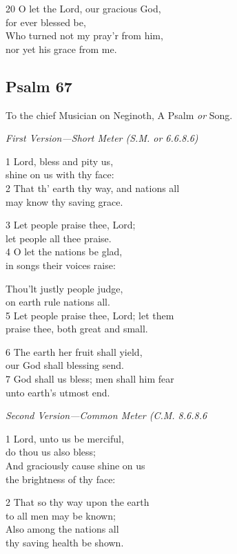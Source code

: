 20 O let the Lord, our gracious God,\\
for ever blessed be,\\
Who turned not my pray’r from him,\\
nor yet his grace from me.

\begin{center}
\quad{}\quad{}
\end{center}

\subsection*{Psalm 67}

To the chief Musician on Neginoth,
A Psalm \emph{or} Song.

\emph{First Version---Short Meter (S.M. or 6.6.8.6)}

1 Lord, bless and pity us,\\
shine on us with thy face:\\
2 That th’ earth thy way, and nations all\\
may know thy saving grace.

3 Let people praise thee, Lord;\\
let people all thee praise.\\
4 O let the nations be glad,\\
in songs their voices raise:

Thou’lt justly people judge,\\
on earth rule nations all.\\
5 Let people praise thee, Lord; let them\\
praise thee, both great and small.

6 The earth her fruit shall yield,\\
our God shall blessing send.\\
7 God shall us bless; men shall him fear\\
unto earth’s utmost end.

\emph{Second Version---Common Meter (C.M. 8.6.8.6}

1 Lord, unto us be merciful,\\
do thou us also bless;\\
And graciously cause shine on us\\
the brightness of thy face:

2 That so thy way upon the earth\\
to all men may be known;\\
Also among the nations all\\
thy saving health be shown.

